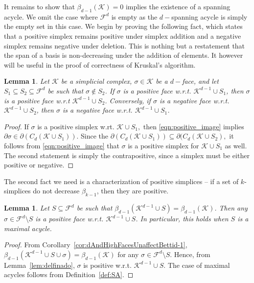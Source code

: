 \documentclass[12pt]{amsart}
\newcommand{\dy}[1]{\textcolor{magenta}{#1}}
\newcommand{\gt}[1]{\textcolor{blue}{#1}}
\renewcommand{\dy}[1]{#1}
\renewcommand{\gt}[1]{#1}
\newtheorem{lemma}[theorem]{Lemma}
\numberwithin{equation}{section}
\numberwithin{theorem}{section}
\newcommand{\1}{\mathbf{1}}
\def\F{\mathcal{F}}
\def\K{\mathcal{K}}
\begin{document}
It remains to show that $\beta_{d-1}(\K) = 0$ implies the existence of a spanning acycle. We omit the case where \gt{$\F^{d}$} is empty as the $d-$spanning acycle is simply the empty set in this case. 
We begin by proving the following fact, which states that a positive simplex remains positive under simplex addition and a negative simplex remains negative under deletion. \dy{This is nothing but a restatement that the span of a basis is non-decreasing under the addition of elements. It however will be useful in the proof of correctness of Kruskal's algorithm.}
%
\begin{lemma}
\label{lem:+ve_faces}
Let $\K$ be a simplicial complex, $\sigma \in \K$ be a $d-$face, and let $S_1 \subseteq S_2 \subseteq \F^d$ be such that $\sigma \notin S_2$. If $\sigma$ is a positive face w.r.t. $\K^{d-1} \cup S_1$, then $\sigma$ is a positive face w.r.t $\K^{d-1} \cup S_2$. Conversely, if $\sigma$ is a negative face w.r.t. $\K^{d-1} \cup S_2$, then $\sigma$ is a negative face w.r.t. $\K^{d-1} \cup S_1$.
\end{lemma}
\begin{proof}
If $\sigma$ is a positive simplex w.rt. $\K\cup S_1,$ then \eqref{eqn:positive_image} implies $\partial\sigma \in \partial(C_d(\K\cup S_1))$. Since the $\partial(C_d(\K\cup S_1)) \subseteq \partial(C_d(\K\cup S_2),$ \gt{it follows from \eqref{eqn:positive_image}} that $\sigma$ is a positive simplex for $\K\cup S_1$ as well. The second statement is simply the contrapositive, since a simplex must be either positive or negative. 
\end{proof}
The second fact we need is a characterization of positive simplices -- if a set of $k$-simplices do not decrease $\beta_{k-1}$, then they are positive. 
\begin{lemma}
\label{lem:+ve_SA}
Let $S \subseteq \F^d$ be such that  $\beta_{d-1}(\K^{d-1} \cup S) = \beta_{d-1}(\K)$. Then any $\sigma \in \F^d \setminus S$ is a positive face w.r.t. $\K^{d-1} \cup S$. In particular, this holds when $S$ is a \dy{maximal} acycle.
\end{lemma}
	\begin{proof}
	From \gt{Corollary~\ref{cor:dAndHighFacesUnaffectBettid-1}}, $\beta_{d-1}(\K^{d-1} \cup S \cup \sigma) = \beta_{d-1}(\K)$ for any $\sigma \in \F^d \setminus S.$ Hence, from Lemma~\ref{lem:delfinado}, $\sigma$ is positive  w.r.t. $\K^{d-1} \cup S$. \gt{The case of maximal acycles follows from Definition~\ref{def:SA}}.
\end{proof}
\end{document}

